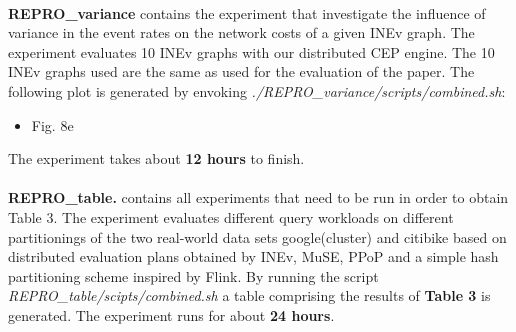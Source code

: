 \documentclass{article}
\begin{document}
\\
\textbf{REPRO\_variance} contains the experiment that investigate the influence of variance in the event rates on the network costs of a given INEv graph. The experiment evaluates 10 INEv graphs with our distributed CEP engine. The 10 INEv graphs used are the same as used for the evaluation of the paper. The following plot is generated by envoking \textit{./REPRO\_variance/scripts/combined.sh}:
\begin{itemize}
\item Fig. 8e
\end{itemize}
The experiment takes about \textbf{12 hours} to finish.
\\
\\
\textbf{REPRO\_table.} contains all experiments that need to be run in order to obtain Table 3. The experiment evaluates different query workloads on different partitionings of the two real-world data sets google(cluster) and citibike based on distributed evaluation plans obtained by INEv, MuSE, PPoP and a simple hash partitioning scheme inspired by Flink. 
By running the script \textit{REPRO\_table/scipts/combined.sh} a table comprising the results of \textbf{Table 3} is generated. 
The experiment runs for about \textbf{24 hours}. 
\end{document}

